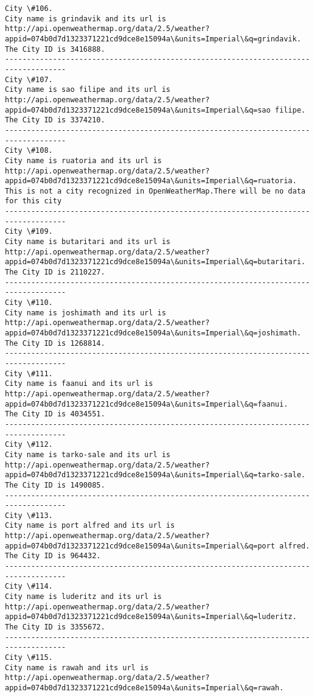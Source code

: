 \documentclass[11pt]{article}
\begin{document}
\begin{Verbatim}[commandchars=\\\{\}]
City \#106.
City name is grindavik and its url is http://api.openweathermap.org/data/2.5/weather?appid=074b0d7d1323371221cd9dce8e15094a\&units=Imperial\&q=grindavik.
The City ID is 3416888.
------------------------------------------------------------------------------------
City \#107.
City name is sao filipe and its url is http://api.openweathermap.org/data/2.5/weather?appid=074b0d7d1323371221cd9dce8e15094a\&units=Imperial\&q=sao filipe.
The City ID is 3374210.
------------------------------------------------------------------------------------
City \#108.
City name is ruatoria and its url is http://api.openweathermap.org/data/2.5/weather?appid=074b0d7d1323371221cd9dce8e15094a\&units=Imperial\&q=ruatoria.
This is not a city recognized in OpenWeatherMap.There will be no data for this city
------------------------------------------------------------------------------------
City \#109.
City name is butaritari and its url is http://api.openweathermap.org/data/2.5/weather?appid=074b0d7d1323371221cd9dce8e15094a\&units=Imperial\&q=butaritari.
The City ID is 2110227.
------------------------------------------------------------------------------------
City \#110.
City name is joshimath and its url is http://api.openweathermap.org/data/2.5/weather?appid=074b0d7d1323371221cd9dce8e15094a\&units=Imperial\&q=joshimath.
The City ID is 1268814.
------------------------------------------------------------------------------------
City \#111.
City name is faanui and its url is http://api.openweathermap.org/data/2.5/weather?appid=074b0d7d1323371221cd9dce8e15094a\&units=Imperial\&q=faanui.
The City ID is 4034551.
------------------------------------------------------------------------------------
City \#112.
City name is tarko-sale and its url is http://api.openweathermap.org/data/2.5/weather?appid=074b0d7d1323371221cd9dce8e15094a\&units=Imperial\&q=tarko-sale.
The City ID is 1490085.
------------------------------------------------------------------------------------
City \#113.
City name is port alfred and its url is http://api.openweathermap.org/data/2.5/weather?appid=074b0d7d1323371221cd9dce8e15094a\&units=Imperial\&q=port alfred.
The City ID is 964432.
------------------------------------------------------------------------------------
City \#114.
City name is luderitz and its url is http://api.openweathermap.org/data/2.5/weather?appid=074b0d7d1323371221cd9dce8e15094a\&units=Imperial\&q=luderitz.
The City ID is 3355672.
------------------------------------------------------------------------------------
City \#115.
City name is rawah and its url is http://api.openweathermap.org/data/2.5/weather?appid=074b0d7d1323371221cd9dce8e15094a\&units=Imperial\&q=rawah.

\end{Verbatim}
\end{document}
